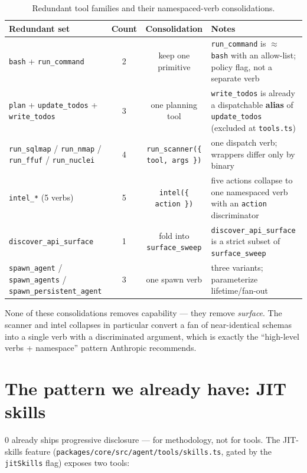 \documentclass[11pt]{article}
\begin{document}
\begin{table}[ht]
\centering
\small
\begin{tabular}{lccl}
\toprule
Redundant set & Count & Consolidation & Notes \\
\midrule
\texttt{bash} + \texttt{run\_command} & 2 & keep one primitive & \texttt{run\_command} is $\approx$ \texttt{bash} with an allow-list; policy flag, not a separate verb \\
\texttt{plan} + \texttt{update\_todos} + \texttt{write\_todos} & 3 & one planning tool & \texttt{write\_todos} is already a dispatchable \textbf{alias} of \texttt{update\_todos} (excluded at \texttt{tools.ts}) \\
\texttt{run\_sqlmap} / \texttt{run\_nmap} / \texttt{run\_ffuf} / \texttt{run\_nuclei} & 4 & \texttt{run\_scanner(\{ tool, args \})} & one dispatch verb; wrappers differ only by binary \\
\texttt{intel\_*} (5 verbs) & 5 & \texttt{intel(\{ action \})} & five actions collapse to one namespaced verb with an \texttt{action} discriminator \\
\texttt{discover\_api\_surface} & 1 & fold into \texttt{surface\_sweep} & \texttt{discover\_api\_surface} is a strict subset of \texttt{surface\_sweep} \\
\texttt{spawn\_agent} / \texttt{spawn\_agents} / \texttt{spawn\_persistent\_agent} & 3 & one spawn verb & three variants; parameterize lifetime/fan-out \\
\bottomrule
\end{tabular}
\caption{Redundant tool families and their namespaced-verb consolidations.}
\label{tab:redundancy}
\end{table}

None of these consolidations removes capability --- they remove \textit{surface}.
The scanner and intel collapses in particular convert a fan of near-identical
schemas into a single verb with a discriminated argument, which is exactly the
``high-level verbs + namespace'' pattern Anthropic recommends.

\section{The pattern we already have: JIT skills}

0 already ships progressive disclosure --- for methodology, not for tools. The
JIT-skills feature (\texttt{packages/core/src/agent/tools/skills.ts}, gated by the
\texttt{jitSkills} flag) exposes two tools:
\end{document}
